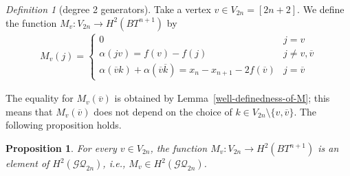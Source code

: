 \documentclass[12pt]{amsart}
\newtheorem{proposition}[theorem]{Proposition}
\theoremstyle{remark}
\newtheorem{definition}{Definition}[section]
\numberwithin{equation}{section}
\begin{document}
\begin{definition}[degree 2 generators]
\label{deg-2-gen}
Take a vertex $v\in V_{2n}=[2n+2]$. 
We define the function $M_{v}:V_{2n}\to H^{2}(BT^{n+1})$ by 
\begin{align*}
M_{v}(j)=\left\{
\begin{array}{ll}
0 & j=v \\
\alpha(jv)=f(v)-f(j) & j\not=v,\overline{v} \\
\alpha(\overline{v}k)+\alpha(\overline{v}\overline{k})=x_{n}-x_{n+1}-2f(\overline{v}) & j=\overline{v} 
\end{array}
\right.
\end{align*}
\end{definition}
The equality for $M_{v}(\overline{v})$ is obtained by Lemma~\ref{well-definedness-of-M}; this means that $M_{v}(\overline{v})$ does not depend on the choice of $k\in V_{2n}\setminus\{v,\overline{v}\}$.
The following proposition holds.
\begin{proposition}
For every $v\in V_{2n}$, the function $M_{v}:V_{2n}\to H^{2}(BT^{n+1})$ is an element of $H^{2}(\mathcal{GQ}_{2n})$, i.e., 
$M_{v}\in H^{2}(\mathcal{GQ}_{2n})$. 
\end{proposition}
\end{document}
